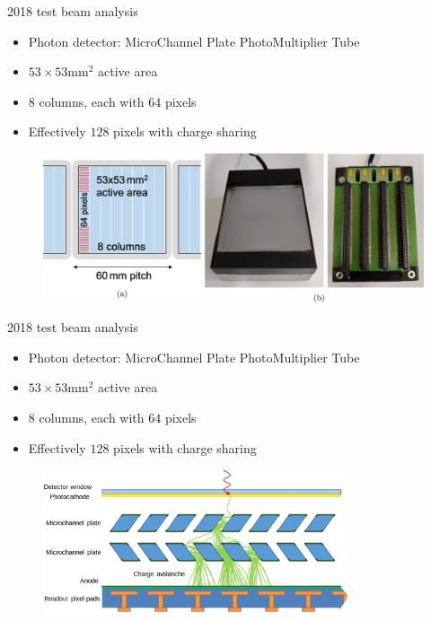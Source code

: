 \documentclass[xcolor={dvipsnames}]{beamer}
\begin{document}
\begin{frame}{2018 test beam analysis}
  \begin{itemize}
    \setlength\itemsep{1.0em}
    \item{Photon detector: MicroChannel Plate PhotoMultiplier Tube}
    \item{$53\times 53\si{\milli\meter\squared}$ active area}
    \item{$8$ columns, each with $64$ pixels}
    \item{Effectively $128$ pixels with charge sharing}
  \end{itemize}
  \begin{figure}
    \centering
    \includegraphics[width = 1.0\textwidth,trim={0 0.5cm 0 0},clip=true]{Figs/TORCH_testbeam_2018_MCPPMT.jpg}
  \end{figure}
\end{frame}

\begin{frame}{2018 test beam analysis}
  \begin{itemize}
    \setlength\itemsep{1.0em}
    \item{Photon detector: MicroChannel Plate PhotoMultiplier Tube}
    \item{$53\times 53\si{\milli\meter\squared}$ active area}
    \item{$8$ columns, each with $64$ pixels}
    \item{Effectively $128$ pixels with charge sharing}
  \end{itemize}
  \vspace{-0.35cm}
  \begin{figure}
    \centering
    \includegraphics[width = 0.8\textwidth]{Figs/MCP_PMT_illustration.png}
  \end{figure}
\end{frame}
\end{document}
